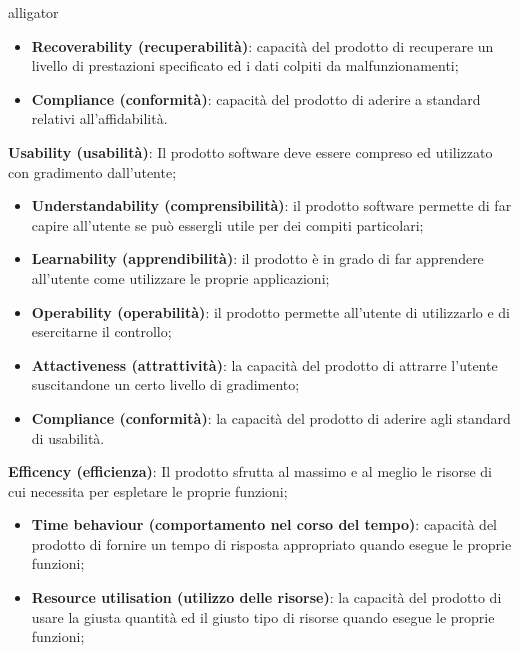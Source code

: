 \begin{labeling}{alligator}
\begin{itemize}
		\item \textbf{Recoverability (recuperabilità)}: capacità del prodotto di recuperare un livello di prestazioni specificato ed i dati colpiti da malfunzionamenti;
		
		\item \textbf{Compliance (conformità)}: capacità del prodotto di aderire a standard relativi all'affidabilità.
	\end{itemize}
	
	\item \textbf{Usability (usabilità)}: Il prodotto software deve essere compreso ed utilizzato con gradimento dall'utente;
	\begin{itemize}
		\item \textbf{Understandability (comprensibilità)}: il prodotto software permette di far capire all'utente se può essergli utile per dei compiti particolari;
		
		\item \textbf{Learnability (apprendibilità)}: il prodotto è in grado di far apprendere all'utente come utilizzare le proprie applicazioni;
		
		\item \textbf{Operability (operabilità)}: il prodotto permette all'utente di utilizzarlo e di esercitarne il controllo;
		
		\item \textbf{Attactiveness (attrattività)}: la capacità del prodotto di attrarre l'utente suscitandone un certo livello di gradimento;
		
		\item \textbf{Compliance (conformità)}: la capacità del prodotto di aderire agli standard di usabilità.
	\end{itemize}
	
	\item \textbf{Efficency (efficienza)}: Il prodotto sfrutta al massimo e al meglio le risorse di cui necessita per espletare le proprie funzioni;
	\begin{itemize}
		\item \textbf{Time behaviour (comportamento nel corso del tempo)}: capacità del prodotto di fornire un tempo di risposta appropriato quando esegue le proprie funzioni;
		
		\item \textbf{Resource utilisation (utilizzo delle risorse)}: la capacità del prodotto di usare la giusta quantità ed il giusto tipo di risorse quando esegue le proprie funzioni;
		

\end{itemize}
\end{labeling}

